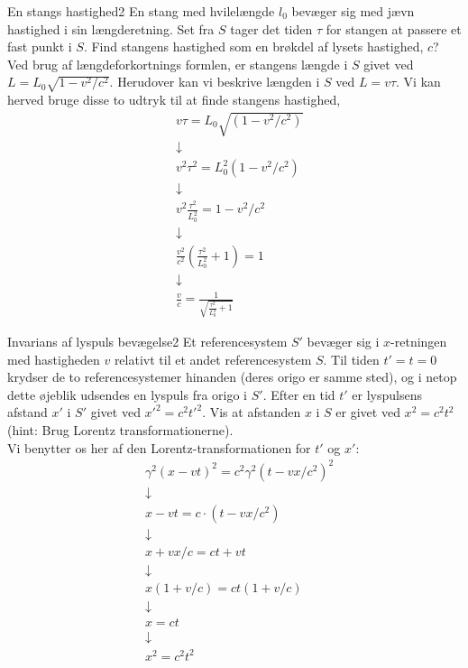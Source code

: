\begin{opgave}{En stangs hastighed}{2}
	En stang med hvilelængde $l_0$ bevæger sig med jævn hastighed i sin længderetning. Set fra $S$ tager det tiden $\tau$ for stangen at passere et fast punkt i $S$. 
	\opg Find stangens hastighed som en brøkdel af lysets hastighed, $c$?\\
	
	Ved brug af længdeforkortnings formlen, er stangens længde i $S$ givet ved $L=L_0\sqrt{1-v^2/c^2}$. Herudover kan vi beskrive længden i $S$ ved $L=v\tau$. Vi kan herved bruge disse to udtryk til at finde stangens hastighed,
	\begin{align*}
		&v\tau=L_0\sqrt{(1-v^2/c^2)} \\
		&\downarrow \\
		&v^2\tau^2=L_0^2(1-v^2/c^2) \\
		&\downarrow \\
		&v^2\frac{\tau^2}{L_0^2}=1-v^2/c^2 \\
		&\downarrow \\
		&\frac{v^2}{c^2}(\frac{\tau^2}{L_0^2}+1)=1 \\
		&\downarrow \\
		&\frac{v}{c}=\frac{1}{\sqrt{\frac{\tau^2}{L_0^2}+1}}
	\end{align*}
\end{opgave}

\begin{opgave}{Invarians af lyspuls bevægelse}{2}
	Et referencesystem $S'$ bevæger sig i $x$-retningen med hastigheden $v$ relativt til et andet referencesystem $S$. Til tiden $t'=t=0$ krydser de to referencesystemer hinanden (deres origo er samme sted), og i netop dette øjeblik udsendes en lyspuls fra origo i $S'$. Efter en tid $t'$ er lyspulsens afstand $x'$ i $S'$ givet ved $x'^2 = c^2 t'^2$. 
	\opg Vis at afstanden $x$ i $S$ er givet ved $x^2 = c^2 t^2$ (hint: Brug Lorentz transformationerne).\\
	
		Vi benytter os her af den Lorentz-transformationen for $t'$ og $x'$:
	\begin{align*}
	&\gamma^2(x-vt)^2=c^2\gamma^2(t-vx/c^2)^2 \\
	&\downarrow \\
	&x-vt=c \cdot (t-vx/c^2) \\
	&\downarrow \\
	&x+vx/c=ct+vt \\
	&\downarrow \\
	&x(1+v/c)=ct(1+v/c) \\
	&\downarrow \\
	&x=ct \\
	&\downarrow \\
	&x^2=c^2t^2		
	\end{align*} 
\end{opgave}

